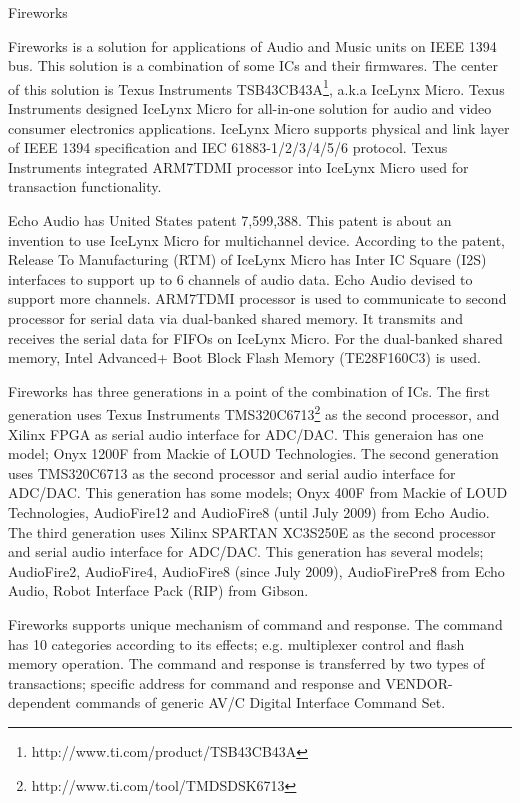 

Fireworks

Fireworks is a solution for applications of Audio and Music units on IEEE 1394 bus. This solution is a combination of some ICs and their firmwares. The center of this solution is Texus Instruments TSB43CB43A\footnote{http://www.ti.com/product/TSB43CB43A}, a.k.a IceLynx Micro. Texus Instruments designed IceLynx Micro for all-in-one solution for audio and video consumer electronics applications. IceLynx Micro supports physical and link layer of IEEE 1394 specification and IEC 61883-1/2/3/4/5/6 protocol. Texus Instruments integrated ARM7TDMI processor into IceLynx Micro used for transaction functionality.

Echo Audio has United States patent 7,599,388. This patent is about an invention to use IceLynx Micro for multichannel device. According to the patent, Release To Manufacturing (RTM) of IceLynx Micro has Inter IC Square (I2S) interfaces to support up to 6 channels of audio data. Echo Audio devised to support more channels. ARM7TDMI processor is used to communicate to second processor for serial data via dual-banked shared memory. It transmits and receives the serial data for FIFOs on IceLynx Micro. For the dual-banked shared memory, Intel Advanced+ Boot Block Flash Memory (TE28F160C3) is used.

Fireworks has three generations in a point of the combination of ICs. The first generation uses Texus Instruments TMS320C6713\footnote{http://www.ti.com/tool/TMDSDSK6713} as the second processor, and Xilinx FPGA as serial audio interface for ADC/DAC. This generaion has one model; Onyx 1200F from Mackie of LOUD Technologies. The second generation uses TMS320C6713 as the second processor and serial audio interface for ADC/DAC. This generation has some models; Onyx 400F from Mackie of LOUD Technologies, AudioFire12 and AudioFire8 (until July 2009) from Echo Audio. The third generation uses Xilinx SPARTAN XC3S250E as the second processor and serial audio interface for ADC/DAC. This generation has several models; AudioFire2, AudioFire4, AudioFire8 (since July 2009), AudioFirePre8 from Echo Audio, Robot Interface Pack (RIP) from Gibson.

Fireworks supports unique mechanism of command and response. The command has 10 categories according to its effects; e.g. multiplexer control and flash memory operation. The command and response is transferred by two types of transactions; specific address for command and response and VENDOR-dependent commands of generic AV/C Digital Interface Command Set.

